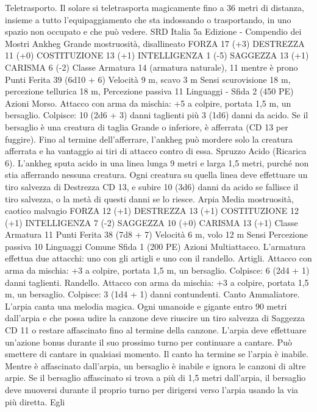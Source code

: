 \begin{multicols}{2}
Teletrasporto. Il solare si teletrasporta magicamente fino a 36 metri
di distanza, insieme a tutto l’equipaggiamento che sta indossando o
trasportando, in uno spazio non occupato e che può vedere.
SRD Italia 5a Edizione - Compendio dei Mostri
Ankheg
Grande mostruosità, disallineato
FORZA 17 (+3)
DESTREZZA 11 (+0)
COSTITUZIONE 13 (+1)
INTELLIGENZA 1 (-5)
SAGGEZZA 13 (+1)
CARISMA 6 (-2)
Classe Armatura 14 (armatura naturale), 11 mentre è prono
Punti Ferita 39 (6d10 + 6)
Velocità 9 m, scavo 3 m
Sensi scurovisione 18 m, percezione tellurica 18 m, Percezione
passiva 11
Linguaggi -
Sfida 2 (450 PE)
Azioni
Morso. Attacco con arma da mischia: +5 a colpire, portata 1,5
m, un bersaglio.
Colpisce: 10 (2d6 + 3) danni taglienti più 3 (1d6) danni da acido.
Se il bersaglio è una creatura di taglia Grande o inferiore, è
afferrata (CD 13 per fuggire). Fino al termine dell’afferrare,
l’ankheg può mordere solo la creatura afferrata e ha vantaggio ai
tiri di attacco contro di essa.
Spruzzo Acido (Ricarica 6). L’ankheg sputa acido in una linea
lunga 9 metri e larga 1,5 metri, purché non stia afferrando
nessuna creatura. Ogni creatura su quella linea deve effettuare un
tiro salvezza di Destrezza CD 13, e subire 10 (3d6) danni da
acido se fallisce il tiro salvezza, o la metà di questi danni se lo
riesce.
Arpia
Media mostruosità, caotico malvagio
FORZA 12 (+1)
DESTREZZA 13 (+1)
COSTITUZIONE 12 (+1)
INTELLIGENZA 7 (-2)
SAGGEZZA 10 (+0)
CARISMA 13 (+1)
Classe Armatura 11
Punti Ferita 38 (7d8 + 7)
Velocità 6 m, volo 12 m
Sensi Percezione passiva 10
Linguaggi Comune
Sfida 1 (200 PE)
Azioni
Multiattacco. L’armatura effettua due attacchi: uno con gli
artigli e uno con il randello.
Artigli. Attacco con arma da mischia: +3 a colpire, portata 1,5
m, un bersaglio.
Colpisce: 6 (2d4 + 1) danni taglienti.
Randello. Attacco con arma da mischia: +3 a colpire, portata 1,5
m, un bersaglio.
Colpisce: 3 (1d4 + 1) danni contundenti.
Canto Ammaliatore. L’arpia canta una melodia magica. Ogni
umanoide e gigante entro 90 metri dall’arpia e che possa udire la
canzone deve riuscire un tiro salvezza di Saggezza CD 11 o
restare affascinato fino al termine della canzone. L’arpia deve
effettuare un’azione bonus durante il suo prossimo turno per
continuare a cantare. Può smettere di cantare in qualsiasi
momento. Il canto ha termine se l’arpia è inabile.
Mentre è affascinato dall’arpia, un bersaglio è inabile e ignora le
canzoni di altre arpie. Se il bersaglio affascinato si trova a più di
1,5 metri dall’arpia, il bersaglio deve muoversi durante il proprio
turno per dirigersi verso l’arpia usando la via più diretta. Egli

\end{multicols}
